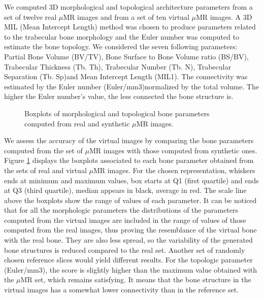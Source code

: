 \documentclass{article}
\begin{document}
%
We computed 3D morphological and topological architecture parameters from a set of twelve real $\mu$MR images and from a set of ten virtual $\mu$MR images. 
A 3D MIL (Mean Intercept Length) method was chosen to produce parameters related to the trabecular bone morphology and the Euler number was computed to estimate the bone topology. 
We considered the seven following parameters: Partial Bone Volume (BV/TV), Bone Surface to Bone Volume ratio (BS/BV), Trabecular Thickness (Tb. Th), Trabecular Number (Tb. N), Trabecular Separation (Tb. Sp)and Mean Intercept Length (MIL1). 
The connectivity was estimated by the Euler number (Euler/mm3)normalized by the total volume. The higher the Euler number's value, the less connected the bone structure is.

\begin{figure}
 \centering 
\caption{Boxplots of morphological and topological bone parameters computed from real and synthetic $\mu$MR images.}
 \label{fig:bone_parametres}
\end{figure}

We assess the accuracy of the virtual images by comparing the bone parameters computed from the set of 
$\mu$MR images with those computed from synthetic ones. Figure \ref{fig:bone_parametres} displays the boxplots associated to each bone parameter obtained from the sets of real and virtual $\mu$MR images. For the chosen representation, whiskers ends at minimum and maximum values, box starts at Q1 (first quartile) and ends at Q3 (third quartile), median appears in black, average in red. The scale line above the boxplots show the range of values of each parameter. It can be noticed that for all the morphologic parameters the distributions of the parameters computed from the virtual images are included in the range of values of those computed from the real images, thus proving the resemblance of the virtual bone with the real bone. They are also less spread, so the variability of the generated bone structures is reduced compared to the real set. Another set of randomly chosen reference slices would yield different results. 
For the topologic parameter (Euler/mm3), the score is slightly higher than the maximum value obtained with the $\mu$MR set, which remains satisfying. It means that the bone structure in the virtual images has a somewhat lower connectivity than in the reference set.  
\end{document}
